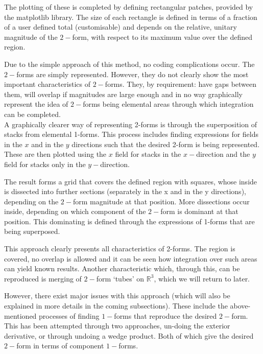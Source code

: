 \documentclass[12pt]{report}
\begin{document}
\noindent The plotting of these is completed by defining rectangular patches, provided by the matplotlib library. The size of each rectangle is defined in terms of a fraction of a user defined total (customisable) and depends on the relative, unitary magnitude of the $2-$form, with respect to its maximum value over the defined region.

\noindent Due to the simple approach of this method, no coding complications occur. The $2-$forms are simply represented. However, they do not clearly show the most important characteristics of $2-$forms. They, by requirement: have gaps between them, will overlap if magnitudes are large enough and in no way graphically represent the idea of $2-$forms being elemental areas through which integration can be completed.\\

A graphically clearer way of representing 2-forms is through the superposition of stacks from elemental 1-forms. This process includes finding expressions for fields in the $x$ and in the $y$ directions such that the desired 2-form is being represented. These are then plotted using the $x$ field for stacks in the $x-$direction and the $y$ field for stacks only in the $y-$direction.

\noindent The result forms a grid that covers the defined region with squares, whose inside is dissected into further sections (separately in the x and in the y directions), depending on the $2-$form magnitude at that position. More dissections occur inside, depending on which component of the $2-$form is dominant at that position. This dominating is defined through the expressions of 1-forms that are being superposed.

This approach clearly presents all characteristics of 2-forms. The region is covered, no overlap is allowed and it can be seen how integration over such areas can yield known results. Another characteristic which, through this, can be reproduced is merging of $2-$form `tubes' on $\mathbb{R}^{3}$, which we will return to later.

However, there exist major issues with this approach (which will also be explained in more details in the coming subsections). These include the above-mentioned processes of finding $1-$forms that reproduce the desired $2-$form. This has been attempted through two approaches, un-doing the exterior derivative, or through undoing a wedge product. Both of which give the desired $2-$form in terms of component $1-$forms.
\end{document}
